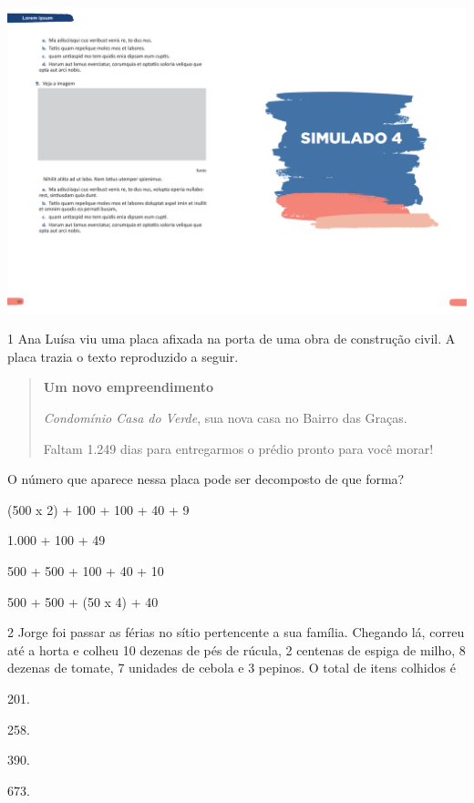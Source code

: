 \vspace*{-3.4cm}
\hspace*{-3.7cm}\includegraphics[scale=1]{../watermarks/4simulado5ano.pdf}

\num{1} Ana Luísa viu uma placa afixada na porta de uma obra de construção civil. A placa trazia o texto reproduzido a seguir.

\begin{quote}
\textbf{Um novo empreendimento}

\textit{Condomínio Casa do Verde}, sua nova casa no Bairro das Graças.

Faltam 1.249 dias para entregarmos o prédio pronto para você morar!
\end{quote}

O número que aparece nessa placa pode ser decomposto de que forma?

\begin{escolha}
\item (500 x 2) + 100 + 100 + 40 + 9
\item 1.000 + 100 + 49  
\item 500 + 500 + 100 + 40 + 10  
\item 500 + 500 + (50 x 4) + 40  
\end{escolha}


\num{2} Jorge foi passar as férias no sítio pertencente a sua família. Chegando lá,
correu até a horta e colheu 10 dezenas de pés de rúcula, 2 centenas de
espiga de milho, 8 dezenas de tomate, 7 unidades de cebola e 3 pepinos.
O total de itens colhidos é

\begin{escolha}
\item
  201.
\item
  258.
\item
  390.
\item
  673.
\end{escolha}


